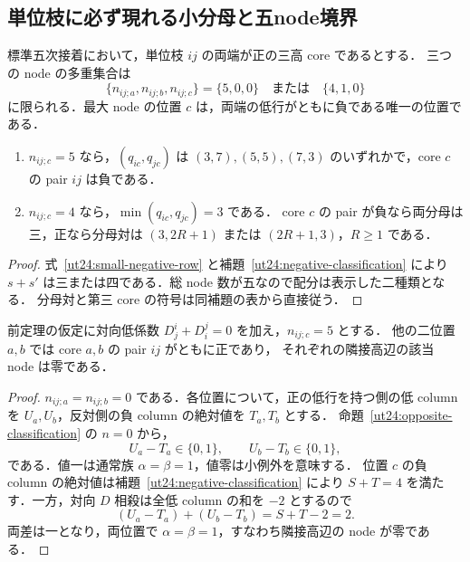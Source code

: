 \subsection{単位枝に必ず現れる小分母と五node境界}

\begin{theorem}
\label{ut24:unit-edge-boundary}
標準五次接着において，単位枝 $ij$ の両端が正の三高 core であるとする．
三つの node の多重集合は
\[
 \{n_{ij;a},n_{ij;b},n_{ij;c}\}
   =\{5,0,0\}\quad\text{または}\quad\{4,1,0\}
\]
に限られる．最大 node の位置 $c$ は，両端の低行がともに負である唯一の位置である．
\begin{enumerate}
 \item $n_{ij;c}=5$ なら，$(q_{ic},q_{jc})$ は
 $(3,7),(5,5),(7,3)$ のいずれかで，core $c$ の pair $ij$ は負である．
 \item $n_{ij;c}=4$ なら，$\min(q_{ic},q_{jc})=3$ である．
 core $c$ の pair が負なら両分母は三，正なら分母対は
 $(3,2R+1)$ または $(2R+1,3)$，$R\ge1$ である．
\end{enumerate}
\end{theorem}

\begin{proof}
式~\eqref{ut24:small-negative-row} と補題~\ref{ut24:negative-classification} により
$s+s'$ は三または四である．総 node 数が五なので配分は表示した二種類となる．
分母対と第三 core の符号は同補題の表から直接従う．
\end{proof}

\begin{proposition}
\label{ut24:five-node-positive}
前定理の仮定に対向低係数 $D^i_j+D^j_i=0$ を加え，$n_{ij;c}=5$ とする．
他の二位置 $a,b$ では core $a,b$ の pair $ij$ がともに正であり，
それぞれの隣接高辺の該当 node は零である．
\end{proposition}

\begin{proof}
$n_{ij;a}=n_{ij;b}=0$ である．各位置について，正の低行を持つ側の低 column を
$U_a,U_b$，反対側の負 column の絶対値を $T_a,T_b$ とする．
命題~\ref{ut24:opposite-classification} の $n=0$ から，
\[
 U_a-T_a\in\{0,1\},\qquad U_b-T_b\in\{0,1\},
\]
である．値一は通常族 $\alpha=\beta=1$，値零は小例外を意味する．
位置 $c$ の負 column の絶対値は補題~\ref{ut24:negative-classification} により
$S+T=4$ を満たす．一方，対向 $D$ 相殺は全低 column の和を $-2$ とするので
\[
 (U_a-T_a)+(U_b-T_b)=S+T-2=2.
\]
両差は一となり，両位置で $\alpha=\beta=1$，すなわち隣接高辺の node が零である．
\end{proof}

